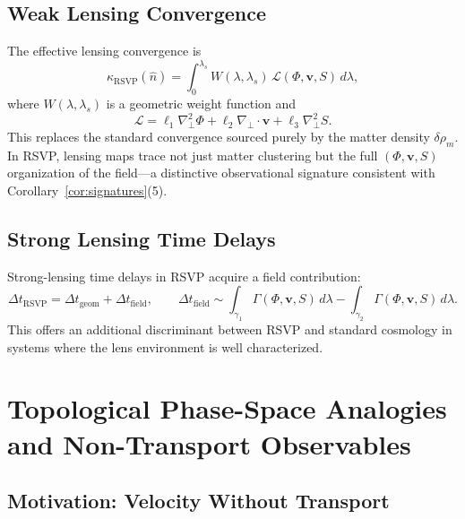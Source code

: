 \documentclass[12pt,a4paper]{article}
\theoremstyle{remark}
\newcommand{\vv}{\mathbf{v}}
\begin{document}
\subsection{Weak Lensing Convergence}

The effective lensing convergence is
\begin{equation}
\kappa_{\mathrm{RSVP}}(\hat{n}) = \int_0^{\lambda_s} W(\lambda, \lambda_s)\,\mathcal{L}(\Phi, \vv, S)\, d\lambda,
\end{equation}
where $W(\lambda, \lambda_s)$ is a geometric weight function and
\begin{equation}
\mathcal{L} = \ell_1 \nabla_\perp^2 \Phi + \ell_2 \nabla_\perp \cdot \vv + \ell_3 \nabla_\perp^2 S.
\end{equation}
This replaces the standard convergence sourced purely by the matter density $\delta\rho_m$. In RSVP, lensing maps trace not just matter clustering but the full $(\Phi, \vv, S)$ organization of the field---a distinctive observational signature consistent with Corollary~\ref{cor:signatures}(5).

\subsection{Strong Lensing Time Delays}

Strong-lensing time delays in RSVP acquire a field contribution:
\begin{equation}
\Delta t_{\mathrm{RSVP}} = \Delta t_{\mathrm{geom}} + \Delta t_{\mathrm{field}},
\qquad
\Delta t_{\mathrm{field}} \sim \int_{\gamma_1}\Gamma(\Phi,\vv,S)\, d\lambda - \int_{\gamma_2}\Gamma(\Phi,\vv,S)\, d\lambda.
\end{equation}
This offers an additional discriminant between RSVP and standard cosmology in systems where the lens environment is well characterized.

\section{Topological Phase-Space Analogies and Non-Transport Observables}
\label{sec:singularity}

\subsection{Motivation: Velocity Without Transport}
\end{document}
